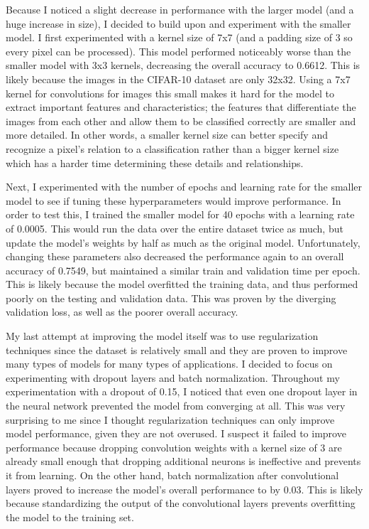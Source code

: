 \documentclass[11pt,a4paper]{article}
\begin{document}
Because I noticed a slight decrease in performance with the larger model (and a huge increase in size), I decided to build upon and experiment
 with the smaller model. I first experimented with a kernel size of 7x7 (and a padding size of 3 so every pixel can be processed).
  This model performed noticeably worse than the smaller model with 3x3 kernels, decreasing the overall accuracy to 0.6612.
   This is likely because the images in the CIFAR-10 dataset are only 32x32. Using a 7x7 kernel for convolutions for images this 
   small makes it hard for the model to extract important features and characteristics; the features that differentiate the images
    from each other and allow them to be classified correctly are smaller and more detailed. In other words, a smaller kernel size 
    can better specify and recognize a pixel's relation to a classification rather than a bigger kernel size which has a harder 
    time determining these details and relationships.

Next, I experimented with the number of epochs and learning rate for the smaller model to see if tuning these hyperparameters 
 would improve performance. In order to test this, I trained the smaller model for 40 epochs with a learning rate of 0.0005.
  This would run the data over the entire dataset twice as much, but update the model's weights by half as much as the original 
  model. Unfortunately, changing these parameters also decreased the performance again to an overall accuracy of 0.7549, 
  but maintained a similar train and validation time per epoch. This is likely because the model overfitted the training data, 
  and thus performed poorly on the testing and validation data. This was proven by the diverging validation loss, as well as the 
  poorer overall accuracy.

My last attempt at improving the model itself was to use regularization techniques since the dataset is relatively small and
 they are proven to improve many types of models for many types of applications. I decided to focus on experimenting with dropout 
 layers and batch normalization. Throughout my experimentation with a dropout of 0.15, I noticed that even one dropout layer in 
 the neural network prevented the model from converging \italics at all. This was very surprising to me since I thought regularization 
 techniques can only improve model performance, given they are not overused. I suspect it failed to improve performance because dropping 
 convolution weights with a kernel size of 3 are already small enough that dropping additional neurons is ineffective and prevents it
  from learning. On the other hand, batch normalization after convolutional layers proved to increase the model's overall performance
  to by 0.03. This is likely because standardizing the output of the convolutional layers prevents overfitting the model to the training set.
\end{document}
